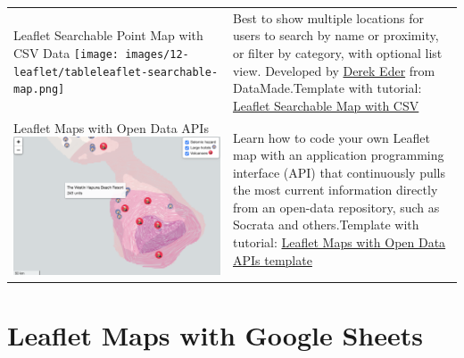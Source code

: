 \documentclass[
  english,
]{book}
\begin{document}
\begin{longtable}[]{@{}
  >{\raggedright\arraybackslash}p{}
  >{\raggedright\arraybackslash}p{}@{}}
Leaflet Searchable Point Map with CSV Data \texttt{[image: images/12-leaflet/tableleaflet-searchable-map.png]} & Best to show multiple locations for users to search by name or proximity, or filter by category, with optional list view. Developed by \href{https://derekeder.com/}{Derek Eder} from DataMade.Template with tutorial: \href{leaflet-searchable-map.html}{Leaflet Searchable Map with CSV} \\
Leaflet Maps with Open Data APIs \includegraphics{images/12-leaflet/tableleaflet-open-data.png} & Learn how to code your own Leaflet map with an application programming interface (API) that continuously pulls the most current information directly from an open-data repository, such as Socrata and others.Template with tutorial: \href{leaflet-maps-open-data-apis.html}{Leaflet Maps with Open Data APIs template} \\
\bottomrule
\end{longtable}

\hypertarget{leaflet-maps-with-google-sheets}{%
\section*{Leaflet Maps with Google Sheets}\label{leaflet-maps-with-google-sheets}}
\end{document}
